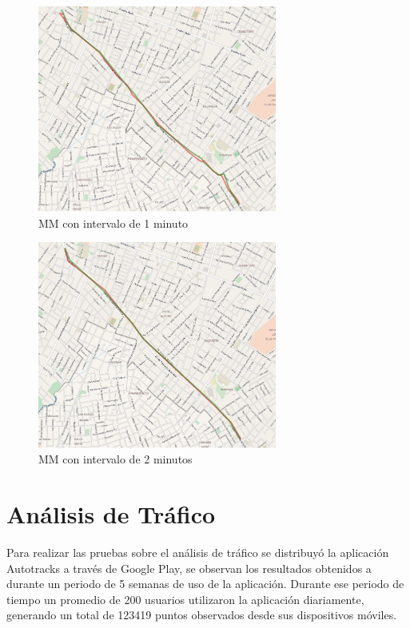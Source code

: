 \begin{figure}[!htb]
	\centering
	\includegraphics[width=0.7\textwidth]{capitulos/7/figuras/figura2.jpg}
	\caption{\label{fig:mm_1m} MM con intervalo de 1 minuto}	
\end{figure}

\begin{figure}[!htb]
	\centering
	\includegraphics[width=0.7\textwidth]{capitulos/7/figuras/figura3.jpg}
	\caption{\label{fig:mm_2m} MM con intervalo de 2 minutos}	
\end{figure}

\section{Análisis de Tráfico}

Para realizar las pruebas sobre el análisis de tráfico se distribuyó la aplicación Autotracks a través de Google Play, se observan los resultados obtenidos a durante un periodo de 5 semanas de uso de la aplicación. Durante ese periodo de tiempo un promedio de 200 usuarios utilizaron la aplicación diariamente, generando un total de 123419 puntos observados desde sus dispositivos móviles.




